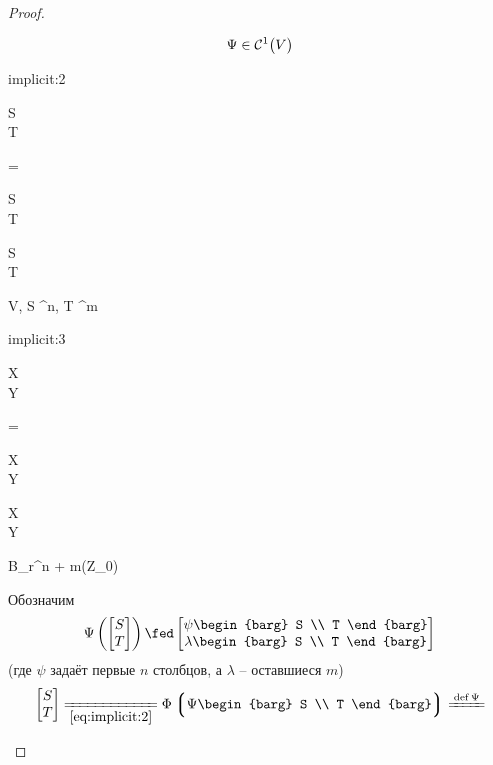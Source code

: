 \begin{proof}
\begin{enumerate}
		$$ \Psi \in \Cont[1]V $$
		\begin{equ}{implicit:2}
			\Phi \left\lgroup \Psi
			\begin{barg}
				S \\
				T
			\end{barg} \right\rgroup =
			\begin{bmatrix}
				S \\
				T
			\end{bmatrix} \qquad \forall
			\begin{bmatrix}
				S \\
				T
			\end{bmatrix} \in V, \qquad S \in \R^n, \quad T \in \R^m
		\end{equ}
		\begin{equ}{implicit:3}
			\Psi \left\lgroup \Phi
			\begin{barg}
				X \\
				Y
			\end{barg} \right\rgroup =
			\begin{bmatrix}
				X \\
				Y
			\end{bmatrix} \qquad \forall
			\begin{bmatrix}
				X \\
				Y
			\end{bmatrix} \in B_r^{n + m}(Z_0)
		\end{equ}
		Обозначим
		$$ \Psi \left(
		\begin{bmatrix}
			S \\
			T
		\end{bmatrix} \right) \fed
		\begin{bmatrix}
			\psi
			\begin{barg}
				S \\
				T
			\end{barg} \\
			\lambda
			\begin{barg}
				S \\
				T
			\end{barg}
		\end{bmatrix} $$
		(где $ \psi $ задаёт первые $ n $ столбцов, а $ \lambda $ -- оставшиеся $ m $)
		$$
		\begin{bmatrix}
			S \\
			T
		\end{bmatrix} \undereq{\eref{implicit:2}} \Phi \left\lgroup \Psi
		\begin{barg}
			S \\
			T
		\end{barg} \right\rgroup \bdefeq\Psi
$$
\end{enumerate}
\end{proof}
